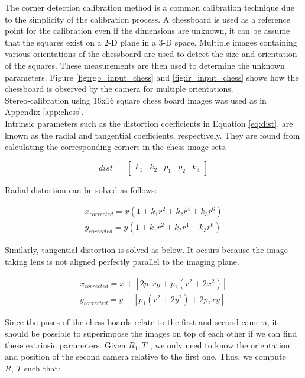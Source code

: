 The corner detection calibration method is a common calibration technique due to the simplicity of the calibration process.  A chessboard is used as a reference point for the calibration even if the dimensions are unknown, it can be assume that the squares exist on a 2-D plane in a 3-D space. Multiple images containing various orientations of the chessboard are used to detect the size and orientation of the squares. These measurements are then used to determine the unknown parameters. Figure \ref{fig:rgb_input_chess} and \ref{fig:ir_input_chess} shows how the chessboard is observed by the camera for multiple orientations.\\

Stereo-calibration using 16x16 square chess board images was used as in Appendix \ref{app:chess}.\\

Intrinsic parameters such as the distortion coefficients in Equation \ref{eq:dist}, are known as the radial and tangential coefficients, respectively. They are found from calculating the corresponding corners in the chess image sets.

\begin{equation}\label{eq:dist}
dist\,=\,\begin{bmatrix}
k_1 & k_2 & p_1 & p_2 & k_3
\end{bmatrix}
\end{equation}

Radial distortion can be solved as follows:

\begin{align*}
x_{corrected} = x( 1 + k_1 r^2 + k_2 r^4 + k_3 r^6) \\
y_{corrected} = y( 1 + k_1 r^2 + k_2 r^4 + k_3 r^6)
\end{align*}

Similarly, tangential distortion is solved as below. It occurs because the image taking lens is not aligned perfectly parallel to the imaging plane.

\begin{align*}
x_{corrected} = x + [ 2p_1xy + p_2(r^2+2x^2)] \\
y_{corrected} = y + [ p_1(r^2+ 2y^2)+ 2p_2xy]
\end{align*}

Since the poses of the chess boards relate to the first and second camera, it should be possible to superimpose the images on top of each other if we can find these extrinsic parameters. Given $R_1, T_1$, we only need to know the orientation and position of the second camera relative to the first one. Thus, we compute $R,\ T$ such that:


